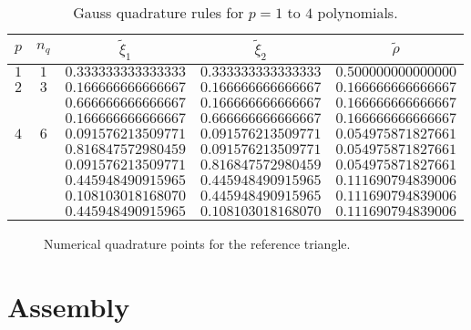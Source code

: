 \begin{table}
  \centering
  \begin{tabular}{ccccc}
    $p$ & $n_q$ & $\tilde \xi_1$ & $\tilde \xi_2$ & $\tilde \rho$ \\
    \hline
    $1$ & $1$ & $0.333333333333333$ & $0.333333333333333$ & $0.500000000000000$ \\
    \hline
    $2$ & $3$ & $0.166666666666667$ & $0.166666666666667$ & $0.166666666666667$ \\ 
    & & $0.666666666666667$ & $0.166666666666667$ & $0.166666666666667$ \\ 
    & & $0.166666666666667$ & $0.666666666666667$ & $0.166666666666667$ \\ 
    \hline
    $4$ & $6$ & $0.091576213509771$ & $0.091576213509771$ & $0.054975871827661$ \\ 
    & & $0.816847572980459$ & $0.091576213509771$ & $0.054975871827661$ \\ 
    & & $0.091576213509771$ & $0.816847572980459$ & $0.054975871827661$ \\ 
    & & $0.445948490915965$ & $0.445948490915965$ & $0.111690794839006$ \\
    & & $0.108103018168070$ & $0.445948490915965$ & $0.111690794839006$ \\ 
    & & $0.445948490915965$ & $0.108103018168070$ & $0.111690794839006$ \\ 
  \end{tabular}
  \caption{Gauss quadrature rules for $p = 1$ to $4$ polynomials.}
  \label{tb:fe_impl_integ_gauss2}
\end{table}

\begin{figure}
  \centering
  \caption{Numerical quadrature points for the reference triangle.}
  \label{fig:fe_impl_integ_gauss2}
\end{figure}

\section{Assembly}


